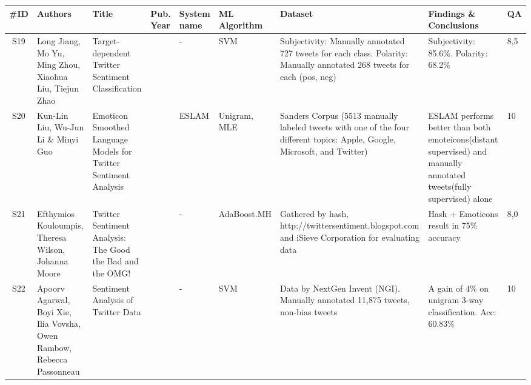 \addtocounter{table}{-1}

\begin{sidewaystable}
    \centering
	\caption{Data extraction step, table 4/4. Showing data as per defined in the SLRP in appendix~\autoref{apx:slrp}}
    \label{tab:extraction4}
    \scriptsize
    \begin{longtable}{|c|p{3cm}|p{4cm}|p{0.6cm}|p{1cm}|p{1.3cm}|p{4cm}|p{3cm}|p{0.3cm}|} 
    
    \hline
    \textbf{\#ID} & \textbf{Authors} & \textbf{Title} & \textbf{Pub. Year} & \textbf{System name} & \textbf{ML Algorithm} & \textbf{Dataset} & \textbf{Findings} \& \textbf{Conclusions} & \textbf{QA} \\ 
    \hline
    
    S19 & Long Jiang, Mo Yu, Ming Zhou, Xiaohua Liu, Tiejun Zhao & Target-dependent Twitter Sentiment Classification & \citeyear{article:jiang} & - & SVM & Subjectivity: Manually annotated 727 tweets for each class. Polarity: Manually annotated 268 tweets for each (pos, neg) & Subjectivity: 85.6\%. Polarity: 68.2\% & 8,5 \\ \hline  
    
    S20 & Kun-Lin Liu, Wu-Jun Li \& Minyi Guo & Emoticon Smoothed Language Models for Twitter Sentiment Analysis & \citeyear{liu2012emoticon} & ESLAM & Unigram, MLE & Sanders Corpus (5513 manually labeled tweets with one of the four different topics: Apple, Google, Microsoft, and Twitter) & ESLAM performs better than both emoteicons(distant supervised) and manually annotated tweets(fully supervised) alone & 10 \\ \hline  
    

    
    S21 & Efthymios Kouloumpis, Theresa Wilson, Johanna Moore & Twitter Sentiment Analysis: The Good the Bad and the OMG! & \citeyear{article:omg} & - & AdaBoost.MH & Gathered by hash, http://twittersentiment.blogspot.com and iSieve Corporation for evaluating data & Hash + Emoticons result in 75\% accuracy & 8,0 \\ \hline  
    
    S22 & Apoorv Agarwal, Boyi Xie, Ilia Vovsha, Owen Rambow, Rebecca Passonneau & Sentiment Analysis of Twitter Data & \citeyear{vovsha2011sentiment} & - & SVM & Data by NextGen Invent (NGI). Manually annotated 11,875 tweets, non-bias tweets & A gain of 4\% on unigram 3-way classification. Acc: 60.83\% & 10 \\ \hline  
    

\end{longtable}
\end{sidewaystable}
